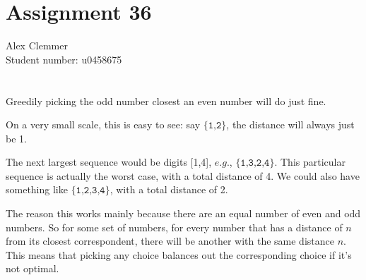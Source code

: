 \documentclass[a4paper]{article}
\begin{document}
\section*{Assignment 36}
Alex Clemmer\\
Student number: u0458675

\section{}

Greedily picking the odd number closest an even number will do just fine.

On a very small scale, this is easy to see: say $\texttt{\{1,2\}}$, the distance will always just be 1.

The next largest sequence would be digits [1,4], $\textit{e.g.}$, $\texttt{\{1,3,2,4\}}$. This particular sequence is actually the worst case, with a total distance of 4. We could also have something like $\texttt{\{1,2,3,4\}}$, with a total distance of 2.

The reason this works mainly because there are an equal number of even and odd numbers. So for some set of numbers, for every number that has a distance of $n$ from its closest correspondent, there will be another with the same distance $n$. This means that picking any choice balances out the corresponding choice if it's not optimal.
\end{document}
